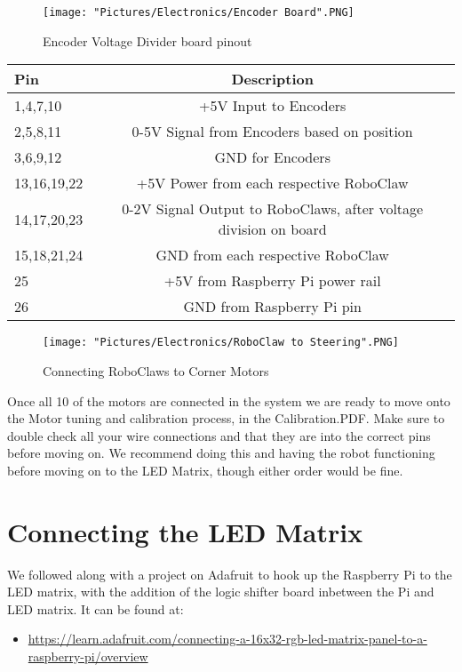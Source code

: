 \documentclass[12pt]{article}
\begin{document}
\begin{figure}[H]
 	\centering
	\texttt{[image: "Pictures/Electronics/Encoder Board".PNG]}
 	\caption{Encoder Voltage Divider board pinout}
	\label{vd pinout}
\end{figure}

\begin{tabular}[2] {| l | c |}
	\hline
	\textbf{Pin} & \textbf{Description} \\ \hline
	1,4,7,10 & +5V Input to Encoders \\ \hline
	2,5,8,11 & 0-5V Signal from Encoders based on position \\ \hline
	3,6,9,12 & GND for Encoders \\ \hline \hline
	13,16,19,22 & +5V Power from each respective RoboClaw \\ \hline
	14,17,20,23 & 0-2V Signal Output to RoboClaws, after voltage division on board \\ \hline
	15,18,21,24 & GND from each respective RoboClaw \\ \hline \hline
	25 & +5V from Raspberry Pi power rail \\ \hline
	26 & GND from Raspberry Pi pin \\ \hline
\end{tabular}

\begin{figure}[H]
 	\centering
	\texttt{[image: "Pictures/Electronics/RoboClaw to Steering".PNG]}
 	\caption{Connecting RoboClaws to Corner Motors}
	\label{RC to Steering}
\end{figure}

Once all 10 of the motors are connected in the system we are ready to move onto the Motor tuning and calibration process, in the Calibration.PDF. Make sure to double check all your wire connections and that they are into the correct pins before moving on. We recommend doing this and having the robot functioning before moving on to the LED Matrix, though either order would be fine.

\section{Connecting the LED Matrix}
We followed along with a project on Adafruit to hook up the Raspberry Pi to the LED matrix, with the addition of the logic shifter board inbetween the Pi and LED matrix. It can be found at:

\begin{itemize}
	\item \href{https://learn.adafruit.com/connecting-a-16x32-rgb-led-matrix-panel-to-a-raspberry-pi/overview}{https://learn.adafruit.com/connecting-a-16x32-rgb-led-matrix-panel-to-a-raspberry-pi/overview}
\end{itemize}
\end{document}
